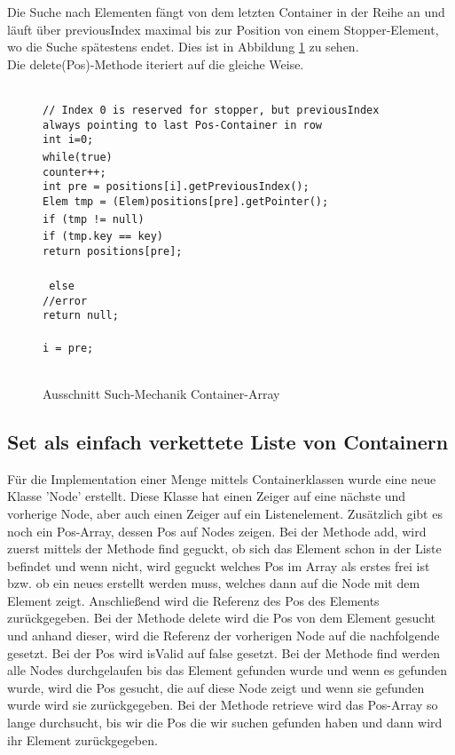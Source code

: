 \documentclass[11pt]{scrartcl}
\begin{document}
Die Suche nach Elementen fängt von dem letzten Container in der Reihe an und läuft über previousIndex maximal bis zur Position von einem Stopper-Element, wo die Suche spätestens endet. Dies ist in Abbildung \ref{figure:findmech} zu sehen.\\
Die delete(Pos)-Methode iteriert auf die gleiche Weise.
\begin{figure}[h!]
\texttt{ \\
// Index 0 is reserved for stopper, but previousIndex always pointing to last Pos-Container in row\\
int i=0;    \\
while(true) {\\
    counter++;\\
    int pre = positions[i].getPreviousIndex();\\
    Elem tmp = (Elem)positions[pre].getPointer();\\
    if (tmp != null) {\\
        if (tmp.key == key) {\\
            return positions[pre];\\
        }\\
    } else {\\
        //error\\
        return null;\\
    }\\
    i = pre;\\
}\\
}
\caption{Ausschnitt Such-Mechanik Container-Array}
\label{figure:findmech}
\end{figure}

\subsection{Set als einfach verkettete Liste von Containern}
\label{sec:setCon}

Für die Implementation einer Menge mittels Containerklassen wurde eine neue Klasse 'Node' erstellt. Diese Klasse hat einen Zeiger auf eine nächste und vorherige Node, aber auch einen Zeiger auf ein Listenelement. Zusätzlich gibt es noch ein Pos-Array, dessen Pos auf Nodes zeigen.
Bei der Methode add, wird zuerst mittels der Methode find geguckt, ob sich das Element schon in der Liste befindet und wenn nicht, wird geguckt welches Pos im Array als erstes frei ist bzw. ob ein neues erstellt werden muss, welches dann auf die Node mit dem Element zeigt. Anschließend wird die Referenz des Pos des Elements zurückgegeben.
Bei der Methode delete wird die Pos von dem Element gesucht und anhand dieser, wird die Referenz der vorherigen Node auf die nachfolgende gesetzt. Bei der Pos wird isValid auf false gesetzt.
Bei der Methode find werden alle Nodes durchgelaufen bis das Element gefunden wurde und wenn es gefunden wurde, wird die Pos gesucht, die auf diese Node zeigt und wenn sie gefunden wurde wird sie zurückgegeben.
Bei der Methode retrieve wird das Pos-Array so lange durchsucht, bis wir die Pos die wir suchen gefunden haben und dann wird ihr Element zurückgegeben.
\end{document}
